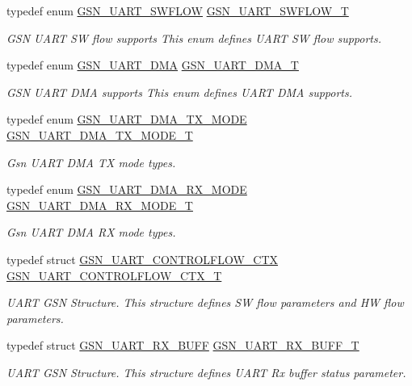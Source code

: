 \begin{DoxyCompactItemize}
typedef enum \hyperlink{a00656_ga7905ed9a5914128d4dd4e1f0ff7a8a56}{GSN\_\-UART\_\-SWFLOW} \hyperlink{a00656_gae4fa00cd25fb7d023d1016b79b520542}{GSN\_\-UART\_\-SWFLOW\_\-T}
\begin{DoxyCompactList}\small\item\em GSN UART SW flow supports This enum defines UART SW flow supports. \end{DoxyCompactList}\item 
typedef enum \hyperlink{a00656_ga48e5ede8ddc3ed1b7967288df611c09d}{GSN\_\-UART\_\-DMA} \hyperlink{a00656_gafc3ee1b15b6b7039d697e48cabeba7de}{GSN\_\-UART\_\-DMA\_\-T}
\begin{DoxyCompactList}\small\item\em GSN UART DMA supports This enum defines UART DMA supports. \end{DoxyCompactList}\item 
typedef enum \hyperlink{a00656_ga09347558a3ca84081b700f762369ff09}{GSN\_\-UART\_\-DMA\_\-TX\_\-MODE} \hyperlink{a00656_gaca97ddd99d6a776d3991457a1113f687}{GSN\_\-UART\_\-DMA\_\-TX\_\-MODE\_\-T}
\begin{DoxyCompactList}\small\item\em Gsn UART DMA TX mode types. \end{DoxyCompactList}\item 
typedef enum \hyperlink{a00656_gaef21b1191deb90943f343ad04ef5339b}{GSN\_\-UART\_\-DMA\_\-RX\_\-MODE} \hyperlink{a00656_ga14b3640ffe5cd4028623beae5472da4a}{GSN\_\-UART\_\-DMA\_\-RX\_\-MODE\_\-T}
\begin{DoxyCompactList}\small\item\em Gsn UART DMA RX mode types. \end{DoxyCompactList}\item 
typedef struct \hyperlink{a00264}{GSN\_\-UART\_\-CONTROLFLOW\_\-CTX} \hyperlink{a00656_ga3db249a0ebcad29608945db9a3628070}{GSN\_\-UART\_\-CONTROLFLOW\_\-CTX\_\-T}
\begin{DoxyCompactList}\small\item\em UART GSN Structure. This structure defines SW flow parameters and HW flow parameters. \end{DoxyCompactList}\item 
typedef struct \hyperlink{a00267}{GSN\_\-UART\_\-RX\_\-BUFF} \hyperlink{a00656_ga9a87f35f38fefe3c4b6a3057aec9b10a}{GSN\_\-UART\_\-RX\_\-BUFF\_\-T}
\begin{DoxyCompactList}\small\item\em UART GSN Structure. This structure defines UART Rx buffer status parameter. \end{DoxyCompactList}\item 

\end{DoxyCompactItemize}
